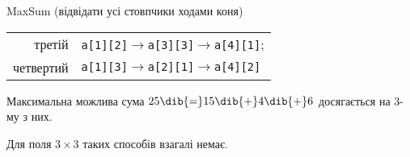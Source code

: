 \begin{problemAllDefault}{MaxSum (відвідати усі стовпчики ходами коня)}
\begin{tabular}{rl}
третій
& 
\verb"a[1][2]"$\rightarrow$\verb"a[3][3]"$\rightarrow$\verb"a[4][1]";
 \\ 

четвертий
& 
\verb"a[1][3]"$\rightarrow$\verb"a[2][1]"$\rightarrow$\verb"a[4][2]"

\end{tabular}
 
Максимальна можлива сума  $25\dib{{=}}15\dib{{+}}4\dib{{+}}6$ досягається на 3-му з них. 
 
Для поля $3\times3$ таких способів взагалі немає. 

\end{problemAllDefault}